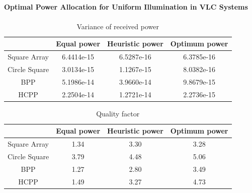 \documentclass{beamer}
\theoremstyle{remark}
\begin{document}
\begin{frame}
\frametitle{\,}
\framesubtitle{Optimal Power Allocation for Uniform Illumination in VLC Systems}
\vfill
\begin{table}[]
\centering
\caption{Variance of received power}
\begin{tabular}{|c|c|c|c|}
 \hline
 & Equal power & Heuristic power & Optimum power   \\
 \hline  
Square Array & 6.4414e-15 & 6.5287e-16 & 6.3785e-16   \\
 \hline 
Circle Square & 3.0134e-15 & 1.1267e-15 &  8.0382e-16  \\
 \hline
BPP & 5.1986e-14 & 3.9660e-14 &  9.8679e-15 \\
 \hline
HCPP  & 2.2504e-14  & 1.2721e-14 &  2.2736e-15 \\
 \hline
\end{tabular}
\end{table}
\vfill
\begin{table}[]
\centering
\caption{Quality factor}
\begin{tabular}{|c|c|c|c|}
 \hline
 & Equal power & Heuristic power & Optimum power   \\
 \hline  
Square Array & 1.34 & 3.30 & 3.28   \\
 \hline 
Circle Square & 3.79 & 4.48 &  5.06 \\
 \hline
BPP & 1.27 & 2.80 &  3.49 \\
 \hline
HCPP  & 1.49  & 3.27 &  4.73 \\
 \hline
\end{tabular}
\end{table}
\vfill
\end{frame}
\end{document}
